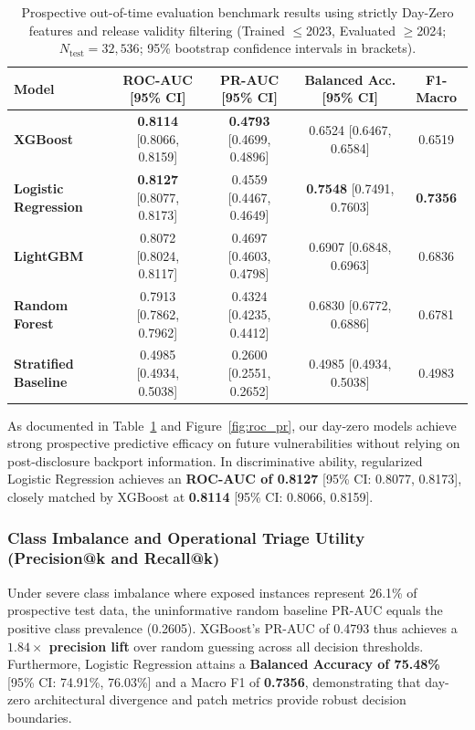 \documentclass[final,5p,times,twocolumn]{elsarticle}
\begin{document}
\begin{table}[t]
\centering
\caption{Prospective out-of-time evaluation benchmark results using strictly Day-Zero features and release validity filtering (Trained $\le$2023, Evaluated $\ge$2024; $N_{\text{test}} = 32,536$; 95\% bootstrap confidence intervals in brackets).}
\label{tab:benchmarks}
\small
\begin{tabular*}{\textwidth}{@{\extracolsep{\fill}}lcccc}
\toprule
\textbf{Model} & \textbf{ROC-AUC [95\% CI]} & \textbf{PR-AUC [95\% CI]} & \textbf{Balanced Acc. [95\% CI]} & \textbf{F1-Macro} \\
\midrule
\textbf{XGBoost} & \textbf{0.8114} [0.8066, 0.8159] & \textbf{0.4793} [0.4699, 0.4896] & 0.6524 [0.6467, 0.6584] & 0.6519 \\
\textbf{Logistic Regression} & \textbf{0.8127} [0.8077, 0.8173] & 0.4559 [0.4467, 0.4649] & \textbf{0.7548} [0.7491, 0.7603] & \textbf{0.7356} \\
\textbf{LightGBM} & 0.8072 [0.8024, 0.8117] & 0.4697 [0.4603, 0.4798] & 0.6907 [0.6848, 0.6963] & 0.6836 \\
\textbf{Random Forest} & 0.7913 [0.7862, 0.7962] & 0.4324 [0.4235, 0.4412] & 0.6830 [0.6772, 0.6886] & 0.6781 \\
\midrule
\textbf{Stratified Baseline} & 0.4985 [0.4934, 0.5038] & 0.2600 [0.2551, 0.2652] & 0.4985 [0.4934, 0.5038] & 0.4983 \\
\bottomrule
\end{tabular*}
\end{table}

As documented in Table~\ref{tab:benchmarks} and Figure~\ref{fig:roc_pr}, our day-zero models achieve strong prospective predictive efficacy on future vulnerabilities without relying on post-disclosure backport information. In discriminative ability, regularized Logistic Regression achieves an \textbf{ROC-AUC of 0.8127} [95\% CI: 0.8077, 0.8173], closely matched by XGBoost at \textbf{0.8114} [95\% CI: 0.8066, 0.8159]. 

\subsubsection{Class Imbalance and Operational Triage Utility (Precision@k and Recall@k)}
Under severe class imbalance where exposed instances represent 26.1\% of prospective test data, the uninformative random baseline PR-AUC equals the positive class prevalence (0.2605). XGBoost's PR-AUC of 0.4793 thus achieves a \textbf{$1.84\times$ precision lift} over random guessing across all decision thresholds. Furthermore, Logistic Regression attains a \textbf{Balanced Accuracy of 75.48\%} [95\% CI: 74.91\%, 76.03\%] and a Macro F1 of \textbf{0.7356}, demonstrating that day-zero architectural divergence and patch metrics provide robust decision boundaries.
\end{document}
